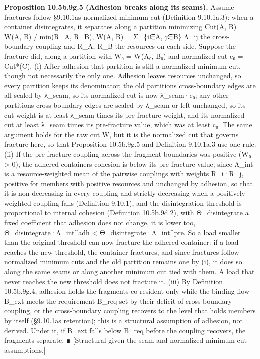 \documentclass[
]{article}
\begin{document}
\textbf{Proposition 10.5b.9g.5 (Adhesion breaks along its seams).}
Assume fractures follow §9.10.1a\textquotesingle s normalized minimum
cut (Definition 9.10.1a.3): when a container disintegrates, it separates
along a partition minimizing Cut(A, B) = W(A, B) / min(R\_A, R\_B), W(A,
B) = Σ\_\{i∈A, j∈B\} Λ\_ij the cross-boundary coupling and R\_A, R\_B
the resources on each side. Suppose the fracture did, along a partition
with W₀ = W(A₀, B₀) and normalized cut c₀ = Cut*(C). (i) After adhesion
that partition is still a normalized minimum cut, though not necessarily
the only one. Adhesion leaves resources unchanged, so every partition
keeps its denominator; the old partition\textquotesingle s
cross-boundary edges are all scaled by λ\_seam, so its normalized cut is
now λ\_seam·c₀; any other partition\textquotesingle s cross-boundary
edges are scaled by λ\_seam or left unchanged, so its cut weight is at
least λ\_seam times its pre-fracture weight, and its normalized cut at
least λ\_seam times its pre-fracture value, which was at least c₀. The
same argument holds for the raw cut W, but it is the normalized cut that
governs fracture here, so that Proposition 10.5b.9g.5 and Definition
9.10.1a.3 use one rule. (ii) If the pre-fracture coupling across the
fragment boundaries was positive (W₀ \textgreater{} 0), the adhered
container\textquotesingle s cohesion is below its pre-fracture value;
since Λ\_int is a resource-weighted mean of the pairwise couplings with
weights R\_i·R\_j, positive for members with positive resources and
unchanged by adhesion, so that it is non-decreasing in every coupling
and strictly decreasing when a positively weighted coupling falls
(Definition 9.10.1), and the disintegration threshold is proportional to
internal cohesion (Definition 10.5b.9d.2), with Θ\_disintegrate a fixed
coefficient that adhesion does not change, it is lower too,
Θ\_disintegrate·Λ\_int\^{}adh \textless{} Θ\_disintegrate·Λ\_int\^{}pre.
So a load smaller than the original threshold can now fracture the
adhered container: if a load reaches the new threshold, the container
fractures, and since fractures follow normalized minimum cuts and the
old partition remains one by (i), it does so along the same seams or
along another minimum cut tied with them. A load that never reaches the
new threshold does not fracture it. (iii) By Definition 10.5b.9g.4,
adhesion holds the fragments co-resident only while the binding flow
B\_ext meets the requirement B\_req set by their deficit of
cross-boundary coupling, or the cross-boundary coupling recovers to the
level that holds members by itself (§9.10.1a\textquotesingle s
retention); this is a structural assumption of adhesion, not derived.
Under it, if B\_ext falls below B\_req before the coupling recovers, the
fragments separate. ∎ {[}Structural given the seam and normalized
minimum-cut assumptions.{]}
\end{document}
